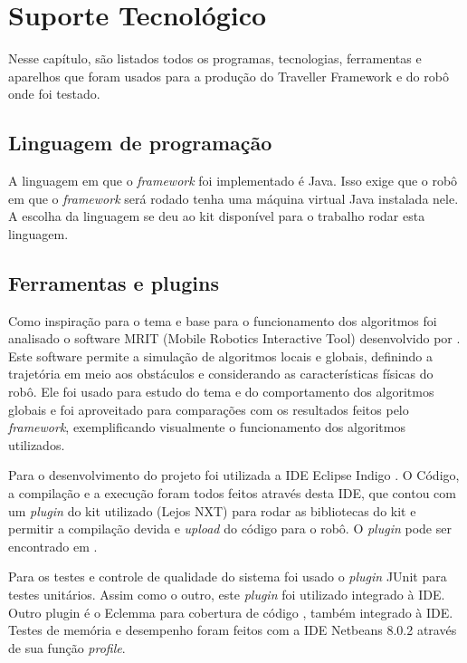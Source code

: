 \chapter[Suporte Tecnológico]{Suporte Tecnológico}

Nesse capítulo, são listados todos os programas, tecnologias, ferramentas e aparelhos que foram usados para a produção do Traveller Framework e do robô onde foi testado.

\section{Linguagem de programação}

A linguagem em que o \textit{framework} foi implementado é Java. Isso exige que o robô em que o \textit{framework} será rodado tenha uma máquina virtual Java instalada nele. A escolha da linguagem se deu ao kit disponível para o trabalho rodar esta linguagem.

\section{Ferramentas e plugins}

Como inspiração para o tema e base para o funcionamento dos algoritmos foi analisado o software MRIT (Mobile Robotics Interactive Tool) \cite{MRIT_SITE} desenvolvido por \cite{Guzman2008}. Este software permite a simulação de algoritmos locais e globais, definindo a trajetória em meio aos obstáculos e considerando as características físicas do robô. Ele foi usado para estudo do tema e do comportamento dos algoritmos globais e foi aproveitado para comparações com os resultados feitos pelo \textit{framework}, exemplificando visualmente o funcionamento dos algoritmos utilizados.

Para o desenvolvimento do projeto foi utilizada a IDE Eclipse Indigo \cite{ECLIPSE_SITE}. O Código, a compilação e a execução foram todos feitos através desta IDE, que contou com um \textit{plugin} do kit utilizado (Lejos NXT) para rodar as bibliotecas do kit e permitir a compilação devida e \textit{upload} do código para o robô. O \textit{plugin} pode ser encontrado em \cite{PLUGIN_NXT_SITE}.

Para os testes e controle de qualidade do sistema foi usado o \textit{plugin} JUnit \cite{JUNIT_SITE} para testes unitários. Assim como o outro, este \textit{plugin} foi utilizado integrado à IDE. Outro plugin é o Eclemma para cobertura de código \cite{ECLEMMA_SITE}, também integrado à IDE. Testes de memória e desempenho foram feitos com a IDE Netbeans 8.0.2 através de sua função \textit{profile}.

